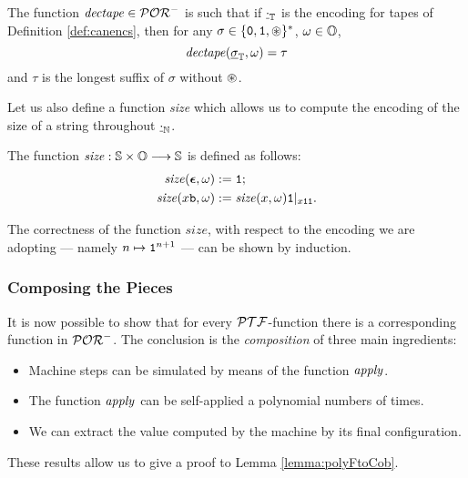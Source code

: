 \begin{lemma}\label{lemma:dectape}
The function $\mathit{dectape}\in \mathcal{POR}^-$
is such that if $\underline{\cdot}_{\mathbb{T}}$
is the encoding for tapes of Definition \ref{def:canencs},
then for any $\sigma\in \{\mathtt{0},\mathtt{1},\circledast\}^*$,
$\omega \in \mathbb{O}$,
$$
\mathit{dectape}(\underline{\sigma}_{\mathbb{T}}, \omega) = \tau
$$
and $\tau$ is the longest suffix of $\sigma$ without $\circledast$.
\end{lemma}

\noindent
Let us also define a function \emph{size}
which allows us to compute the
encoding of the size of a string throughout
$\underline{\cdot}_{\mathbb{N}}$.
\begin{defn}
The function $\mathit{size} : \mathbb{S}\times \mathbb{O} \longrightarrow \mathbb{S}$
is defined as follows:
\begin{align*}
\mathit{size}(\bm{\epsilon}, \omega) &:= \mathtt{1}; \\
\mathit{size}(x\mathtt{b},\omega) &:= \mathit{size}(x,\omega)\mathtt{1}|_{x\mathtt{1}\mathtt{1}}.
\end{align*}
\end{defn}
\noindent
The correctness of the function $\mathit{size}$, with respect to the
encoding we are adopting --- namely $n \mapsto\mathtt{1}^{n +1}$ ---
can be shown by induction.













\subsubsection{Composing the Pieces}
It is now possible to show that for every
$\mathcal{PTF}$-function there is
a corresponding function in $\mathcal{POR}^-$.
%
The conclusion is the \emph{composition} of three main ingredients:
\begin{itemize}
  \item Machine steps can be simulated by means of the function $\mathit{apply}$.
  \item The function $\mathit{apply}$ can be self-applied a polynomial numbers of times.
  \item We can extract the value computed by the machine by its final configuration.
\end{itemize}

These results allow us to give a proof to Lemma \ref{lemma:polyFtoCob}.




